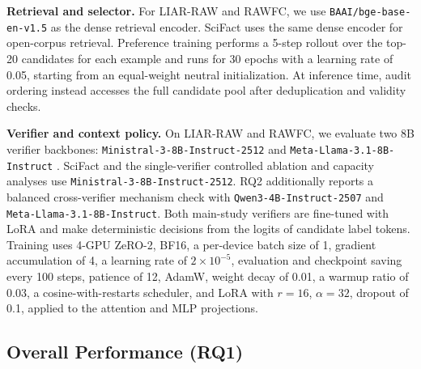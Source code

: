 \documentclass[letterpaper]{article}
\begin{document}
\textbf{Retrieval and selector.} For LIAR-RAW and RAWFC, we use \texttt{BAAI/bge-base-en-v1.5} \citep{Xiao2023BGE} as the dense retrieval encoder. SciFact uses the same dense encoder for open-corpus retrieval. Preference training performs a 5-step rollout over the top-20 candidates for each example and runs for 30 epochs with a learning rate of 0.05, starting from an equal-weight neutral initialization. At inference time, audit ordering instead accesses the full candidate pool after deduplication and validity checks.


\textbf{Verifier and context policy.}
On LIAR-RAW and RAWFC, we evaluate two 8B verifier backbones:
\texttt{Ministral-3-8B-Instruct-2512} \citep{MistralAI2025Ministral3}
and \texttt{Meta-Llama-3.1-8B-Instruct} \citep{patterson2022carbonfootprintmachinelearning}.
SciFact and the single-verifier controlled ablation and capacity
analyses use \texttt{Ministral-3-8B-Instruct-2512}. RQ2 additionally
reports a balanced cross-verifier mechanism check with
\texttt{Qwen3-4B-Instruct-2507} and
\texttt{Meta-Llama-3.1-8B-Instruct}.
Both main-study verifiers are fine-tuned with LoRA and make deterministic
decisions from the logits of candidate label tokens.
Training uses 4-GPU ZeRO-2, BF16, a per-device batch size of 1, gradient accumulation of 4, a learning rate of $2\times10^{-5}$, evaluation and checkpoint saving every 100 steps, patience of 12, AdamW, weight decay of 0.01, a warmup ratio of 0.03, a cosine-with-restarts scheduler, and LoRA with $r=16$, $\alpha=32$, dropout of 0.1, applied to the attention and MLP projections.

\subsection{Overall Performance (RQ1)}
\end{document}
